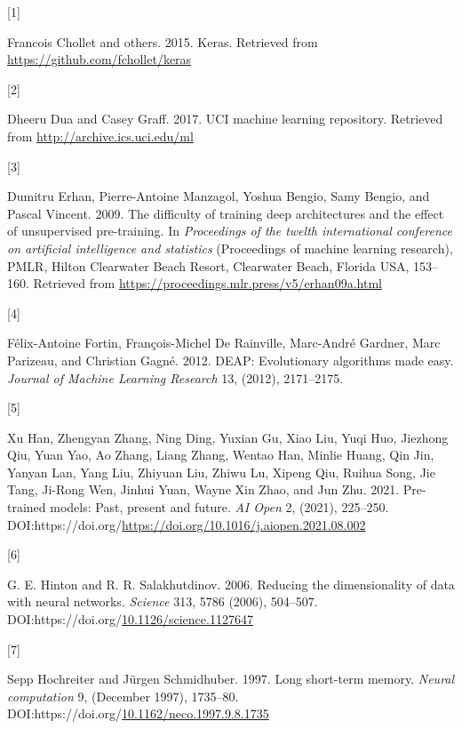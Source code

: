 \documentclass[
  11pt,
]{article}
\newlength{\cslhangindent}
\newlength{\csllabelwidth}
\newlength{\cslentryspacingunit} %
\newenvironment{CSLReferences}[2] %
 {%
  \setlength{\parindent}{0pt}
  \ifodd #1
  \let\oldpar\par
  \def\par{\hangindent=\cslhangindent\oldpar}
  \fi
  \setlength{\parskip}{#2\cslentryspacingunit}
 }%
 {}
\newcommand{\CSLLeftMargin}[1]{\parbox[t]{\csllabelwidth}{#1}}
\newcommand{\CSLRightInline}[1]{\parbox[t]{\linewidth - \csllabelwidth}{#1}\break}
\begin{document}
\hypertarget{refs}{}
\begin{CSLReferences}{0}{0}
\leavevmode{}%
\CSLLeftMargin{{[}1{]} }%
\CSLRightInline{Francois Chollet and others. 2015. Keras. Retrieved from \url{https://github.com/fchollet/keras}}

\leavevmode{}%
\CSLLeftMargin{{[}2{]} }%
\CSLRightInline{Dheeru Dua and Casey Graff. 2017. {UCI} machine learning repository. Retrieved from \url{http://archive.ics.uci.edu/ml}}

\leavevmode{}%
\CSLLeftMargin{{[}3{]} }%
\CSLRightInline{Dumitru Erhan, Pierre-Antoine Manzagol, Yoshua Bengio, Samy Bengio, and Pascal Vincent. 2009. The difficulty of training deep architectures and the effect of unsupervised pre-training. In \emph{Proceedings of the twelth international conference on artificial intelligence and statistics} (Proceedings of machine learning research), PMLR, Hilton Clearwater Beach Resort, Clearwater Beach, Florida USA, 153--160. Retrieved from \url{https://proceedings.mlr.press/v5/erhan09a.html}}

\leavevmode{}%
\CSLLeftMargin{{[}4{]} }%
\CSLRightInline{Félix-Antoine Fortin, François-Michel De Rainville, Marc-André Gardner, Marc Parizeau, and Christian Gagné. 2012. {DEAP}: Evolutionary algorithms made easy. \emph{Journal of Machine Learning Research} 13, (2012), 2171--2175.}

\leavevmode{}%
\CSLLeftMargin{{[}5{]} }%
\CSLRightInline{Xu Han, Zhengyan Zhang, Ning Ding, Yuxian Gu, Xiao Liu, Yuqi Huo, Jiezhong Qiu, Yuan Yao, Ao Zhang, Liang Zhang, Wentao Han, Minlie Huang, Qin Jin, Yanyan Lan, Yang Liu, Zhiyuan Liu, Zhiwu Lu, Xipeng Qiu, Ruihua Song, Jie Tang, Ji-Rong Wen, Jinhui Yuan, Wayne Xin Zhao, and Jun Zhu. 2021. Pre-trained models: Past, present and future. \emph{AI Open} 2, (2021), 225--250. DOI:https://doi.org/\url{https://doi.org/10.1016/j.aiopen.2021.08.002}}

\leavevmode{}%
\CSLLeftMargin{{[}6{]} }%
\CSLRightInline{G. E. Hinton and R. R. Salakhutdinov. 2006. Reducing the dimensionality of data with neural networks. \emph{Science} 313, 5786 (2006), 504--507. DOI:https://doi.org/\href{https://doi.org/10.1126/science.1127647}{10.1126/science.1127647}}

\leavevmode{}%
\CSLLeftMargin{{[}7{]} }%
\CSLRightInline{Sepp Hochreiter and Jürgen Schmidhuber. 1997. Long short-term memory. \emph{Neural computation} 9, (December 1997), 1735--80. DOI:https://doi.org/\href{https://doi.org/10.1162/neco.1997.9.8.1735}{10.1162/neco.1997.9.8.1735}}


\end{CSLReferences}
\end{document}
